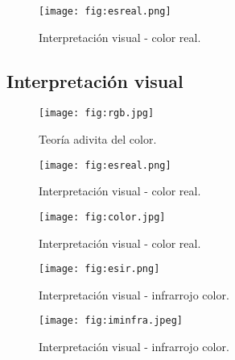 
\begin{frame}{}
  \begin{figure}
    \centering
    \texttt{[image: fig:esreal.png]}
    \caption{Interpretación visual - color real. }
    \label{}
  \end{figure}
\end{frame}



\subsection{Interpretación visual}

\begin{frame}{}
  \begin{figure}
    \centering
    \texttt{[image: fig:rgb.jpg]}
    \caption{Teoría adivita del color.}
    \label{}
  \end{figure}
\end{frame}


\begin{frame}{}
  \begin{figure}
    \centering
    \texttt{[image: fig:esreal.png]}
    \caption{Interpretación visual - color real. }
    \label{}
  \end{figure}
\end{frame}

\begin{frame}{}
  \begin{figure}
    \centering
    \texttt{[image: fig:color.jpg]}
    \caption{Interpretación visual - color real.}
    \label{}
  \end{figure}
\end{frame}
\begin{frame}{}
  \begin{figure}
    \centering
    \texttt{[image: fig:esir.png]}
    \caption{Interpretación visual - infrarrojo color.}
    \label{}
  \end{figure}
\end{frame}


\begin{frame}{}
  \begin{figure}
    \centering
    \texttt{[image: fig:iminfra.jpeg]}
    \caption{Interpretación visual - infrarrojo color.}
    \label{}
  \end{figure}
\end{frame}



